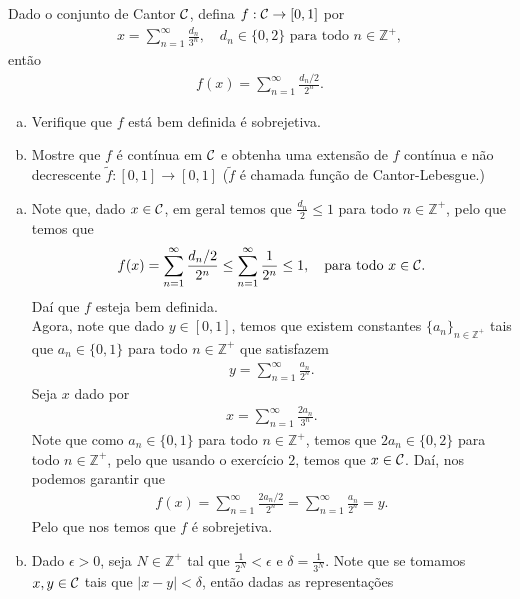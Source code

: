 \begin{homeworkProblem}[3]
  Dado o conjunto de Cantor $\mathcal{C}$, defina $f:\mathcal{C}\to[0,1]$ por
  \begin{align*}
    x=\sum_{n=1}^{\infty}\frac{d_n}{3^n},\quad d_n\in\{0,2\}\text{ para todo }n\in\mathbb{Z}^{+},
  \end{align*}
  então
  \begin{align*}
    f(x)=\sum_{n=1}^{\infty}\frac{d_n/2}{2^n}.
  \end{align*}
  \begin{enumerate}[a)]
    \item Verifique que $f$ está bem definida é sobrejetiva.
    \item Mostre que $f$ é contínua em $\mathcal{C}$ e obtenha uma extensão de $f$ contínua e não decrescente $\tilde{f}:[0,1]\to[0,1]$ ($\tilde{f}$ é chamada função de Cantor-Lebesgue.) 
  \end{enumerate}
  \begin{solution}
  \begin{enumerate}[a)]
    \item Note que, dado $x\in \mathcal{C}$, em geral temos que $\frac{d_n}{2}\leq 1$ para todo $n\in\mathbb{Z}^{+}$, pelo que temos que 
      \begin{align*}
        f(x)=\sum_{n=1}^{\infty}\frac{d_n/2}{2^n}\leq \sum_{n=1}^{\infty}\frac{1}{2^n}\leq 1,\quad\text{para todo }x\in \mathcal{C}.
      \end{align*}
      Daí que $f$ esteja bem definida.\\
      Agora, note que dado $y\in [0,1]$, temos que existem constantes $\{a_n\}_{n\in\mathbb{Z}^{+}}$ tais que $a_n\in\{0,1\}$ para todo $n\in\mathbb{Z}^{+}$ que satisfazem
      \begin{align*}
        y=\sum_{n=1}^{\infty}\frac{a_n}{2^n}.
      \end{align*}
      Seja $x$ dado por 
      \begin{align*}
        x=\sum_{n=1}^{\infty}\frac{2a_n}{3^{n}}.
      \end{align*}
      Note que como $a_n\in\{0,1\}$ para todo $n\in\mathbb{Z}^{+}$, temos que $2a_n\in\{0,2\}$ para todo $n\in\mathbb{Z}^{+}$, pelo que usando o exercício $2$, temos que $x\in\mathcal{C}$. Daí, nos podemos garantir que
      \begin{align*}
        f(x)=\sum_{n=1}^{\infty}\frac{2a_n/2}{2^n}=\sum_{n=1}^{\infty}\frac{a_n}{2^n}=y.
      \end{align*}
      Pelo que nos temos que $f$ é sobrejetiva.
    \item Dado $\epsilon>0$, seja $N\in\mathbb{Z}^{+}$ tal que $\frac{1}{2^N}<\epsilon$ e $\delta=\frac{1}{3^N}$. Note que se tomamos $x,y\in\mathcal{C}$ tais que $|x-y|<\delta$, então dadas as representações

\end{enumerate}
\end{solution}
\end{homeworkProblem}
